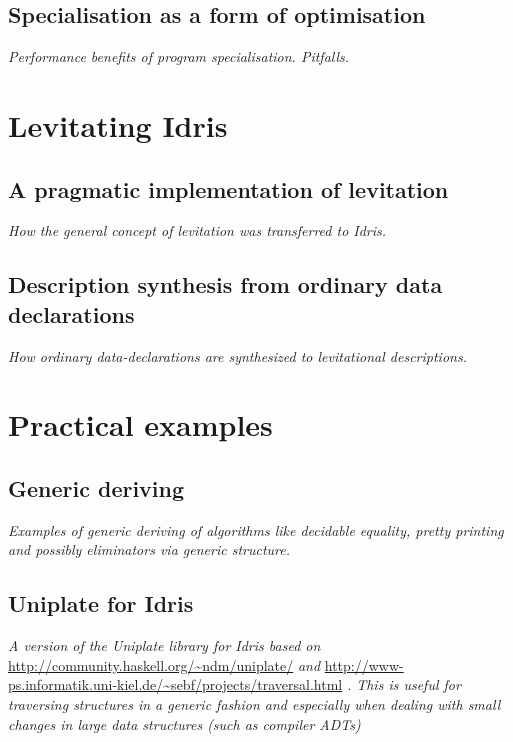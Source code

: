 \documentclass{ituthesis}
\begin{document}
\section{Specialisation as a form of optimisation}
\label{sec:SpecialisationasaFormofOptimization}
\textit{Performance benefits of program specialisation. Pitfalls.}

\chapter{Levitating Idris}
\label{cha:LevitatingIdris}

\section{A pragmatic implementation of levitation}
\label{sec:APragmaticImplementationofLevitation}
\textit{How the general concept of levitation was transferred to Idris.}

\section{Description synthesis from ordinary data declarations}
\label{sec:DescriptionSynthesisFromOrdinaryDataDeclarations}
\textit{How ordinary data-declarations are synthesized to levitational descriptions.}

\chapter{Practical examples}
\label{cha:PracticalExamples}

\section{Generic deriving}
\label{sec:GenericDeriving}
\textit{Examples of generic deriving of algorithms like decidable equality, pretty printing and possibly eliminators via generic structure.}

\section{Uniplate for Idris}
\label{sec:UniplateforIdris}
\textit{A version of the Uniplate library for Idris based on} \url{http://community.haskell.org/~ndm/uniplate/} \textit{and} \url{http://www-ps.informatik.uni-kiel.de/~sebf/projects/traversal.html} \textit{.
This is useful for traversing structures in a generic fashion and especially when dealing with small changes in large data structures (such as compiler ADTs)}
\end{document}

